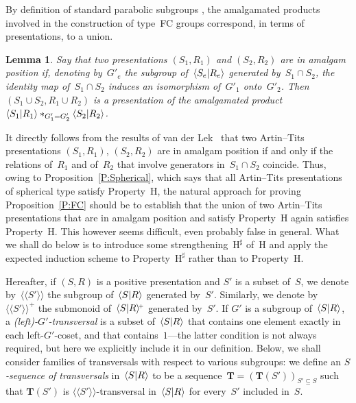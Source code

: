 \documentclass{amsart}
\numberwithin{equation}{section}
\theoremstyle{plain}
\newtheorem{lemm}[prop]{Lemma}
\theoremstyle{definition}
\begin{document}
By definition of standard parabolic subgroups \cite{VdL}, the amalgamated products involved in the construction of type~FC groups correspond, in terms of presentations, to a union.

\begin{lemm}
\label{L:Amalg}
Say that two presentations $({S}_1, {R}_1)$ and $({S}_2, {R}_2)$ are in \emph{amalgam position} if, denoting by~${G}'_{e}$ the subgroup of~${\langle{{S}_{e}}{\mid}\nobreak{{R}_{e}}\rangle}$ generated by~${S}_1 \cap {S}_2$, the identity map of~${S}_1 \cap {S}_2$ induces an isomorphism of~${G}'_1$ onto~${G}'_2$. Then $({S}_1 \cup {S}_2, {R}_1 \cup {R}_2)$ is a presentation of the amalgamated product ${\langle{{S}_1}{\mid}\nobreak{{R}_1}\rangle} *_{{G}'_1 = {G}'_2} {\langle{{S}_2}{\mid}\nobreak{{R}_2}\rangle}$.
\end{lemm}

It directly follows from the results of van der Lek~\cite{VdL} that two Artin--Tits presentations $({S}_1, {R}_1)$, $({S}_2, {R}_2)$ are in amalgam position if and only if the relations of~${R}_1$ and of~${R}_2$ that involve generators in~${S}_1 \cap {S}_2$ coincide. Thus, owing to Proposition~\ref{P:Spherical}, which says that all Artin--Tits presentations of spherical type satisfy Property~${\mathrm{H}}$, the natural approach for proving Proposition~\ref{P:FC} should be to establish that the union of two Artin--Tits presentations that are in amalgam position and satisfy Property~${\mathrm{H}}$ again satisfies Property~${\mathrm{H}}$. This however seems difficult, even probably false in general. What we shall do below is to introduce some strengthening~${{\mathrm{H}}^\sharp}$ of~${\mathrm{H}}$ and apply the expected induction scheme to Property~${{\mathrm{H}}^\sharp}$ rather than to Property~${\mathrm{H}}$.

Hereafter, if $({S}, {R})$ is a positive presentation and ${S}'$ is a subset of~${S}$, we denote by~${\langle\!\langle{{{S}'}}\rangle\!\rangle}$ the subgroup of~${\langle{S}{\mid}\nobreak{R}\rangle}$ generated by~${S}'$. Similarly, we denote by~${\langle\!\langle{{{S}'}}\rangle\!\rangle^{\!\scriptscriptstyle+}}$ the submonoid of~${\langle{S}{\mid}\nobreak{R}\rangle^{\!\scriptscriptstyle+}}$ generated by~${S}'$. If ${G}'$ is a subgroup of~${\langle{S}{\mid}\nobreak{R}\rangle}$, a \emph{(left)-${G}'$-transversal} is a subset of~${\langle{S}{\mid}\nobreak{R}\rangle}$ that contains one element exactly in each left-${G}'$-coset, and that contains~$1$---the latter condition is not always required, but here we explicitly include it in our definition. Below, we shall consider families of transversals with respect to various subgroups: we define an \emph{${S}$-sequence of transversals} in~${\langle{S}{\mid}\nobreak{R}\rangle}$ to be a sequence~${\boldsymbol{T}} = ({\boldsymbol{T}}({S}'))_{{S}' {\subseteq} {S}}$ such that ${\boldsymbol{T}}({S}')$ is ${\langle\!\langle{{{S}'}}\rangle\!\rangle}$-transversal in~${\langle{S}{\mid}\nobreak{R}\rangle}$ for every~${S}'$ included in~${S}$.
\end{document}
